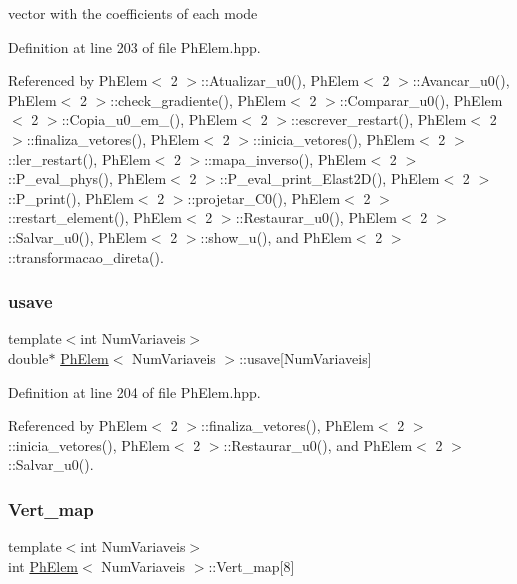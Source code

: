 vector with the coefficients of each mode 



Definition at line 203 of file Ph\+Elem.\+hpp.



Referenced by Ph\+Elem$<$ 2 $>$\+::\+Atualizar\+\_\+u0(), Ph\+Elem$<$ 2 $>$\+::\+Avancar\+\_\+u0(), Ph\+Elem$<$ 2 $>$\+::check\+\_\+gradiente(), Ph\+Elem$<$ 2 $>$\+::\+Comparar\+\_\+u0(), Ph\+Elem$<$ 2 $>$\+::\+Copia\+\_\+u0\+\_\+em\+\_\+(), Ph\+Elem$<$ 2 $>$\+::escrever\+\_\+restart(), Ph\+Elem$<$ 2 $>$\+::finaliza\+\_\+vetores(), Ph\+Elem$<$ 2 $>$\+::inicia\+\_\+vetores(), Ph\+Elem$<$ 2 $>$\+::ler\+\_\+restart(), Ph\+Elem$<$ 2 $>$\+::mapa\+\_\+inverso(), Ph\+Elem$<$ 2 $>$\+::\+P\+\_\+eval\+\_\+phys(), Ph\+Elem$<$ 2 $>$\+::\+P\+\_\+eval\+\_\+print\+\_\+\+Elast2\+D(), Ph\+Elem$<$ 2 $>$\+::\+P\+\_\+print(), Ph\+Elem$<$ 2 $>$\+::projetar\+\_\+\+C0(), Ph\+Elem$<$ 2 $>$\+::restart\+\_\+element(), Ph\+Elem$<$ 2 $>$\+::\+Restaurar\+\_\+u0(), Ph\+Elem$<$ 2 $>$\+::\+Salvar\+\_\+u0(), Ph\+Elem$<$ 2 $>$\+::show\+\_\+u(), and Ph\+Elem$<$ 2 $>$\+::transformacao\+\_\+direta().

\mbox{\label{classPhElem_a98781f3744597bad01eff75b31734d4b}} 
\subsubsection{\texorpdfstring{usave}{usave}}
{\footnotesize\ttfamily template$<$int Num\+Variaveis$>$ \\
double$\ast$ \hyperlink{classPhElem}{Ph\+Elem}$<$ Num\+Variaveis $>$\+::usave\mbox{[}Num\+Variaveis\mbox{]}\hspace{0.3cm}{\ttfamily [protected]}}



Definition at line 204 of file Ph\+Elem.\+hpp.



Referenced by Ph\+Elem$<$ 2 $>$\+::finaliza\+\_\+vetores(), Ph\+Elem$<$ 2 $>$\+::inicia\+\_\+vetores(), Ph\+Elem$<$ 2 $>$\+::\+Restaurar\+\_\+u0(), and Ph\+Elem$<$ 2 $>$\+::\+Salvar\+\_\+u0().

\mbox{\label{classPhElem_a07f19f862b13cc9c5f80271b03a5a023}} 
\subsubsection{\texorpdfstring{Vert\+\_\+map}{Vert\_map}}
{\footnotesize\ttfamily template$<$int Num\+Variaveis$>$ \\
int \hyperlink{classPhElem}{Ph\+Elem}$<$ Num\+Variaveis $>$\+::Vert\+\_\+map\mbox{[}8\mbox{]}\hspace{0.3cm}{\ttfamily [protected]}}



